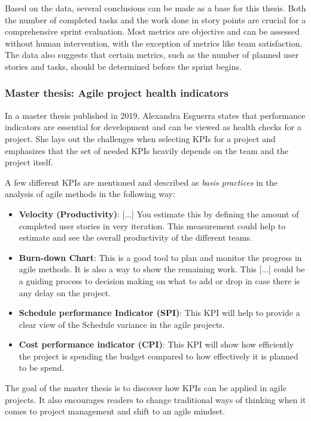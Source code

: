 Based on the data, several conclusions can be made as a base for this thesis.
Both the number of completed tasks and the work done in story
points are crucial for a comprehensive sprint evaluation. 
Most metrics are objective and can be assessed without human intervention, 
with the exception of metrics like team satisfaction. 
The data also suggests that certain metrics, such as the number of 
planned user stories and tasks, 
should be determined before the sprint begins.

\subsubsection{Master thesis: Agile project health indicators}

In a master thesis published in 2019, Alexandra Esguerra states that 
performance indicators are essential for development and can be viewed as health checks for a project.
She lays out the challenges when selecting KPIs for a project and emphasizes that
the set of needed KPIs heavily depends on the team and the project itself.

A few different KPIs are mentioned and described as \textit{basis practices} in the analysis of agile methods in the following way:

\begin{itemize}
    \item \textbf{Velocity (Productivity)}: [...] You estimate this by defining the amount of completed user stories in very iteration. This measurement could help to estimate and see the overall productivity of the different teams.
    \item \textbf{Burn-down Chart}: This is a good tool to plan and monitor the progress in agile methods. It is also a way to show the remaining work. This [...] could be a guiding process to decision making on what to add or drop in case there is any delay on the project.
    \item \textbf{Schedule performance Indicator (SPI)}: This KPI will help to provide a clear view of the Schedule variance in the agile projects.
    \item \textbf{Cost performance indicator (CPI)}: This KPI will show how efficiently the project is spending the budget compared to how effectively it is planned to be spend.
\end{itemize}

The goal of the master thesis is to discover how KPIs can be applied in agile projects.
It also encourages readers to change traditional ways of thinking when it comes to project management
and shift to an agile mindset.

